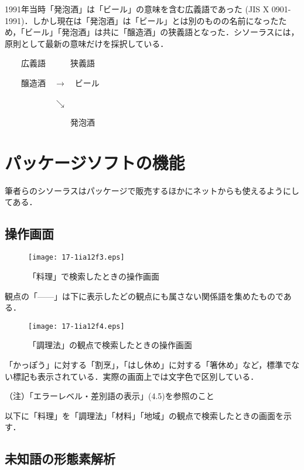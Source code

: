 \documentclass[japanese]{jnlp_1.4}
\begin{document}
1991年当時「発泡酒」は「ビール」の意味を含む広義語であった (JIS X 0901-1991)．しかし現在は「発泡酒」は「ビール」とは別のものの名前になったため，「ビール」「発泡酒」は共に「醸造酒」の狭義語となった．シソーラスには，原則として最新の意味だけを採択している．

　　広義語　　　狭義語

　　醸造酒　$\rightarrow$　ビール

　　　　　　$\searrow$

　　　　　　　　発泡酒



\section{パッケージソフトの機能}

筆者らのシソーラスはパッケージで販売するほかにネットからも使えるようにしてある．


\subsection{操作画面}

\begin{figure}[h]
\vspace{-1\baselineskip}
 \begin{center}
  \texttt{[image: 17-1ia12f3.eps]}
 \end{center}
 \caption{「料理」で検索したときの操作画面}
 \label{fig:3}
\vspace{-1\baselineskip}
\end{figure}

観点の「——」は下に表示したどの観点にも属さない関係語を集めたものである．

\begin{figure}[b]
 \begin{center}
  \texttt{[image: 17-1ia12f4.eps]}
 \end{center}
 \caption{「調理法」の観点で検索したときの操作画面}
 \label{fig:4}
\end{figure}

「かっぽう」に対する「割烹」，「はし休め」に対する「箸休め」など，標準でない標記も表示されている．実際の画面上では文字色で区別している．

（注）「エラーレベル・差別語の表示」(4.5)を参照のこと

以下に「料理」を「調理法」「材料」「地域」の観点で検索したときの画面を示す．



\subsection{未知語の形態素解析}
\end{document}
